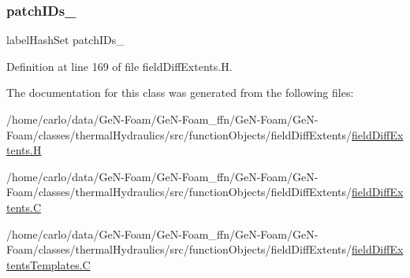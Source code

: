 \subsubsection{\texorpdfstring{patch\+I\+Ds\+\_\+}{patchIDs\_}}
{\footnotesize\ttfamily label\+Hash\+Set patch\+I\+Ds\+\_\+\hspace{0.3cm}{\ttfamily [protected]}}



Definition at line 169 of file field\+Diff\+Extents.\+H.



The documentation for this class was generated from the following files\+:\begin{DoxyCompactItemize}
\item 
/home/carlo/data/\+Ge\+N-\/\+Foam/\+Ge\+N-\/\+Foam\+\_\+ffn/\+Ge\+N-\/\+Foam/\+Ge\+N-\/\+Foam/classes/thermal\+Hydraulics/src/function\+Objects/field\+Diff\+Extents/\hyperlink{fieldDiffExtents_8H}{field\+Diff\+Extents.\+H}\item 
/home/carlo/data/\+Ge\+N-\/\+Foam/\+Ge\+N-\/\+Foam\+\_\+ffn/\+Ge\+N-\/\+Foam/\+Ge\+N-\/\+Foam/classes/thermal\+Hydraulics/src/function\+Objects/field\+Diff\+Extents/\hyperlink{fieldDiffExtents_8C}{field\+Diff\+Extents.\+C}\item 
/home/carlo/data/\+Ge\+N-\/\+Foam/\+Ge\+N-\/\+Foam\+\_\+ffn/\+Ge\+N-\/\+Foam/\+Ge\+N-\/\+Foam/classes/thermal\+Hydraulics/src/function\+Objects/field\+Diff\+Extents/\hyperlink{fieldDiffExtentsTemplates_8C}{field\+Diff\+Extents\+Templates.\+C}\end{DoxyCompactItemize}
